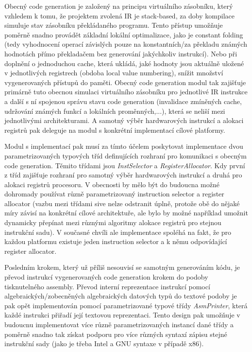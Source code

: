 \documentclass{article}
\begin{document}
Obecný code generation je založený na principu virtuálního zásobníku, který vzhledem k tomu, že projektem zvolená IR je stack-based, za doby kompilace simuluje stav zásobníku překládaného programu. Tento přístup umožňuje poměrně snadno provádět základní lokální optimalizace, jako je constant folding (tedy vyhodnocení operací závislých pouze na konstantních/za překladu známých hodnotách přímo překladačem bez generování jakýchkoliv instrukcí). Nebo při doplnění o jednoduchou cache, která ukládá, jaké hodnoty jsou aktuálně uložené v jednotlivých registrech (obdoba local value numbering), snížit množství vygenerovaných přístupů do paměti. Obecný code generation modul tak zajišťuje primárně tuto obecnou simulaci virtuálního zásobníku pro jednotlivé IR instrukce a další s ní spojenou správu stavu code generation (invalidace zmíněných cache, udržování známých funkcí a lokálních proměnných,...), která se neliší mezi jednotlivými architekturami. A samotný výběr hardwarových instrukcí a alokaci registrů pak deleguje na modul s konkrétní implementací cílové platformy.

Modul s implementací pak musí za tímto účelem poskytovat implementace dvou parametrizovaných typových tříd definujících rozhraní pro komunikaci s obecným code generation. Těmito třídami jsou \textit{InstSelector} a \textit{RegisterAllocator}. Kdy první z tříd zajišťuje rozhraní pro samotný výběr hardwarových instrukcí a druhá pro alokaci registrů procesoru. V obecnosti by mělo být do budoucna možné dohromady používat různě parametrizovaný instruction selector a register allocator (vazbu mezi třídami sive nelze odstranit úplně, protože obě do nějaké míry závisí na konkrétní cílové architektuře, ale bylo by možné například umožnit dynamicky přepínat mezi různými algoritmy alokace registrů pro stejnou instrukční sadu). V současné chvíli ale implementace spoléhá na fakt, že pro každou platformu existuje jeden instruction selector a k němu odpovídající register allocator.

Posledním krokem, který už příliš nesouvisí se samotným generováním kódu, je převod instrukcí vygenerovaných code generation krokem do podoby tisknutelného assembly. Převod interní reprezentace instrukcí pomocí algebraických/zobecněných algebraických datových typů do textové podoby je pak opět implementován pomocí parametrizované typové třídy \textit{AsmPrinter}, která každé instrukci přiřadí její textovou reprezentaci. Tento design pak umožňuje v budoucnu implementovat více různě parametrizovaných instancí dané třídy a poměrně snadno tak získat podporu pro více různých syntaxí zápisu stejné instrukční sady (jako je třeba Intel a GNU syntaxe v případě x86).
\end{document}
